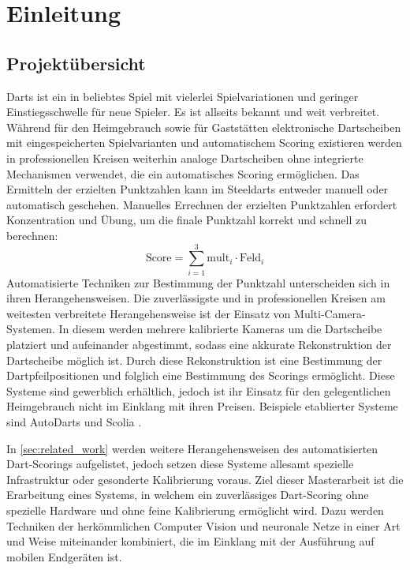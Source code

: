 
\chapter{Einleitung}
\label{cha:einleitung}



\section{Projektübersicht}
\label{sec:projektuebersicht}

Darts ist ein in beliebtes Spiel mit vielerlei Spielvariationen und geringer Einstiegsschwelle für neue Spieler. Es ist allseits bekannt und weit verbreitet. Während für den Heimgebrauch sowie für Gaststätten elektronische Dartscheiben mit eingespeicherten Spielvarianten und automatischem Scoring existieren werden in professionellen Kreisen weiterhin analoge Dartscheiben ohne integrierte Mechanismen verwendet, die ein automatisches Scoring ermöglichen. Das Ermitteln der erzielten Punktzahlen kann im Steeldarts entweder manuell oder automatisch geschehen. Manuelles Errechnen der erzielten Punktzahlen erfordert Konzentration und Übung, um die finale Punktzahl korrekt und schnell zu berechnen:
\[ \text{Score} = \sum_{i=1}^{3} \text{mult}_i \cdot \text{Feld}_i \]
Automatisierte Techniken zur Bestimmung der Punktzahl unterscheiden sich in ihren Herangehensweisen. Die zuverlässigste und in professionellen Kreisen am weitesten verbreitete Herangehensweise ist der Einsatz von Multi-Camera-Systemen. In diesem werden mehrere kalibrierte Kameras um die Dartscheibe platziert und aufeinander abgestimmt, sodass eine akkurate Rekonstruktion der Dartscheibe möglich ist. Durch diese Rekonstruktion ist eine Bestimmung der Dartpfeilpositionen und folglich eine Bestimmung des Scorings ermöglicht. Diese Systeme sind gewerblich erhältlich, jedoch ist ihr Einsatz für den gelegentlichen Heimgebrauch nicht im Einklang mit ihren Preisen. Beispiele etablierter Systeme sind AutoDarts \cite{autodarts} und Scolia \cite{scoliadarts}.

In \autoref{sec:related_work} werden weitere Herangehensweisen des automatisierten Dart-Scorings aufgelistet, jedoch setzen diese Systeme allesamt spezielle Infrastruktur oder gesonderte Kalibrierung voraus. Ziel dieser Masterarbeit ist die Erarbeitung eines Systems, in welchem ein zuverlässiges Dart-Scoring ohne spezielle Hardware und ohne feine Kalibrierung ermöglicht wird. Dazu werden Techniken der herkömmlichen Computer Vision und neuronale Netze in einer Art und Weise miteinander kombiniert, die im Einklang mit der Ausführung auf mobilen Endgeräten ist.

